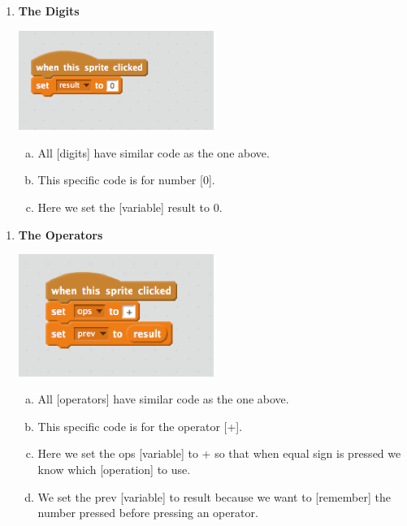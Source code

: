 \documentclass[11pt]{article}
\begin{document}
\noindent\makebox[\linewidth]{\rule{\paperwidth}{0.4pt}}
\begin{enumerate}
\item \textbf{The Digits}
\begin{center}
  \includegraphics[width=2.5in]{numbers.png}
 \end{center}
\begin{enumerate}[a.]
\item All [digits] have similar code as the one above.
\item This specific code is for number [0].
\item Here we set the [variable] result to 0.
\end{enumerate}
\end{enumerate}
\noindent\makebox[\linewidth]{\rule{\paperwidth}{0.4pt}}
\begin{enumerate}
\item \textbf{The Operators}
\begin{center}
  \includegraphics[width=2.5in]{ops.png}
 \end{center}
\begin{enumerate}[a.]
\item All [operators] have similar code as the one above.
\item This specific code is for the operator [+].
\item Here we set the ops [variable] to + so that when equal sign is pressed we know which [operation] to use.
\item We set the prev [variable] to result because we want to [remember] the number pressed before pressing an operator.
\end{enumerate}
\end{enumerate}
\noindent\makebox[\linewidth]{\rule{\paperwidth}{0.4pt}}
\end{document}
